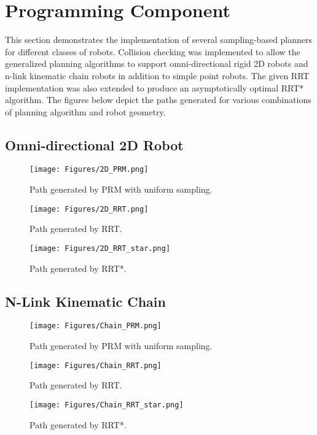 \documentclass[a4 paper]{article}
\begin{document}
\section{Programming Component}

This section demonstrates the implementation of several sampling-based planners for different classes of robots. Collision checking was implemented to allow the generalized planning algorithms to support omni-directional rigid 2D robots and n-link kinematic chain robots in addition to simple point robots. The given RRT implementation was also extended to produce an asymptotically optimal RRT* algorithm. The figures below depict the paths generated for various combinations of planning algorithm and robot geometry.

\subsection{Omni-directional 2D Robot}

\begin{figure}[H]
    \centering
    \texttt{[image: Figures/2D\_PRM.png]}
    \caption{Path generated by PRM with uniform sampling.}
\end{figure}

\begin{figure}[H]
    \centering
    \texttt{[image: Figures/2D\_RRT.png]}
    \caption{Path generated by RRT.}
\end{figure}

\begin{figure}[H]
    \centering
    \texttt{[image: Figures/2D\_RRT\_star.png]}
    \caption{Path generated by RRT*.}
\end{figure}

\subsection{N-Link Kinematic Chain}

\begin{figure}[H]
    \centering
    \texttt{[image: Figures/Chain\_PRM.png]}
    \caption{Path generated by PRM with uniform sampling.}
\end{figure}

\begin{figure}[H]
    \centering
    \texttt{[image: Figures/Chain\_RRT.png]}
    \caption{Path generated by RRT.}
\end{figure}

\begin{figure}[H]
    \centering
    \texttt{[image: Figures/Chain\_RRT\_star.png]}
    \caption{Path generated by RRT*.}
\end{figure}
\end{document}
